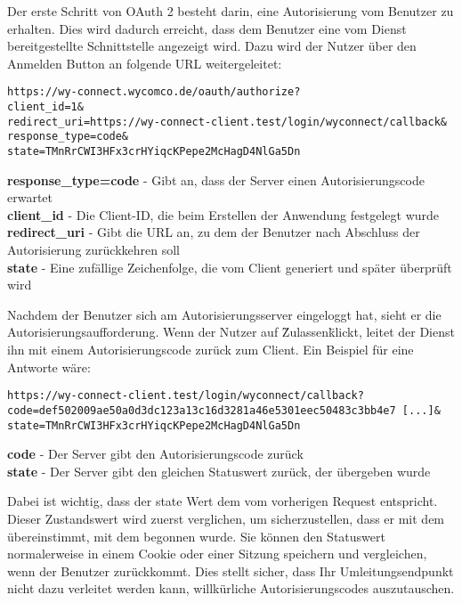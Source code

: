 Der erste Schritt von OAuth 2 besteht darin, eine Autorisierung vom Benutzer zu erhalten. Dies wird dadurch erreicht, dass dem Benutzer eine vom Dienst bereitgestellte Schnittstelle angezeigt wird. Dazu wird der Nutzer über den Anmelden Button an folgende URL weitergeleitet:

\texttt{https://wy-connect.wycomco.de/oauth/authorize?\\
client\_id=1\& \\
redirect\_uri=https://wy-connect-client.test/login/wyconnect/callback\& \\
response\_type=code\& \\
state=TMnRrCWI3HFx3crHYiqcKPepe2McHagD4NlGa5Dn
}

\textbf{response\_type=code} - Gibt an, dass der Server einen Autorisierungscode erwartet \\
\textbf{client\_id} - Die Client-ID, die beim Erstellen der Anwendung festgelegt wurde \\
\textbf{redirect\_uri} - Gibt die URL an, zu dem der Benutzer nach Abschluss der Autorisierung zurückkehren soll \\
\textbf{state} - Eine zufällige Zeichenfolge, die vom Client generiert und später überprüft wird

Nachdem der Benutzer sich am Autorisierungsserver eingeloggt hat, sieht er die Autorisierungsaufforderung. Wenn der Nutzer auf \"Zulassen\" klickt, leitet der Dienst ihn mit einem Autorisierungscode zurück zum Client. Ein Beispiel für eine Antworte wäre:

\texttt{https://wy-connect-client.test/login/wyconnect/callback?\\
code=def502009ae50a0d3dc123a13c16d3281a46e5301eec50483c3bb4e7 [...]\& \\
state=TMnRrCWI3HFx3crHYiqcKPepe2McHagD4NlGa5Dn
}

\textbf{code} - Der Server gibt den Autorisierungscode zurück \\
\textbf{state} - Der Server gibt den gleichen Statuswert zurück, der übergeben wurde

Dabei ist wichtig, dass der state Wert dem vom vorherigen Request entspricht. Dieser Zustandswert wird zuerst verglichen, um sicherzustellen, dass er mit dem übereinstimmt, mit dem begonnen wurde. Sie können den Statuswert normalerweise in einem Cookie oder einer Sitzung speichern und vergleichen, wenn der Benutzer zurückkommt. Dies stellt sicher, dass Ihr Umleitungsendpunkt nicht dazu verleitet werden kann, willkürliche Autorisierungscodes auszutauschen.

